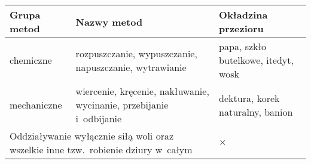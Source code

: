 \documentclass[a4paper]{article}
\begin{document}
\begin{tabular}{|l|p{55mm}|p{33mm}|} \hline
Grupa metod & Nazwy metod & Okładzina przezioru \\ \hline
chemiczne & rozpuszczanie, wypuszczanie, napuszczanie, wytrawianie & papa, szkło butelkowe, itedyt, wosk \\ \hline
mechaniczne & wiercenie, kręcenie, nakłuwanie, wycinanie, przebijanie i~odbijanie & dektura, korek naturalny, banion\\ \hline
\multicolumn{2}{|l|}{\parbox{75mm}{Oddziaływanie wyłącznie siłą woli oraz wszelkie inne 
tzw.~robienie dziury w~całym}} & $\times$ \\ \hline
\end{tabular}
\end{document}
